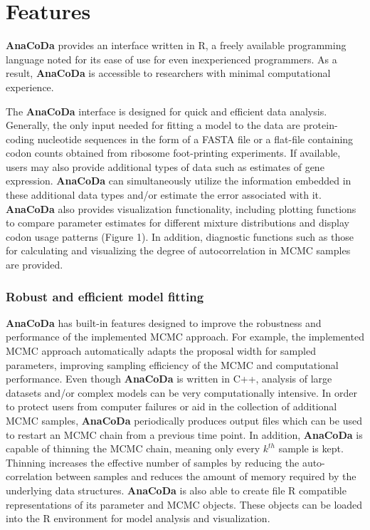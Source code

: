 \documentclass{bioinfo}
\newcommand{\package}{\textbf{AnaCoDa }} %
\begin{document}

\section*{Features}
\package provides an interface written in R, a freely available programming language noted for its ease of use for even inexperienced programmers. 
As a result, \package is accessible to researchers with minimal computational experience. 

The \package interface is designed for quick and efficient data analysis.
Generally, the only input needed for fitting a model to the data are protein-coding nucleotide sequences in the form of a FASTA file or a flat-file containing codon counts obtained from ribosome foot-printing experiments. 
If available, users may also provide additional types of data such as estimates of gene expression.
\package can simultaneously utilize the information embedded in these additional data types and/or estimate the error associated with it.
\package also provides visualization functionality, including plotting functions to compare parameter estimates for different mixture distributions and display codon usage patterns (Figure 1). In addition, diagnostic functions such as those for calculating and visualizing the degree of autocorrelation in MCMC samples are provided.

\subsubsection*{Robust and efficient model fitting}
\package has built-in features designed to improve the robustness and performance of the implemented MCMC approach. 
For example, the implemented MCMC approach automatically adapts the proposal width for sampled parameters, improving sampling efficiency of the MCMC and computational performance.
Even though \package is written in C++, analysis of large datasets and/or complex models can be very computationally intensive.
In order to protect users from computer failures or aid in the collection of additional MCMC samples, \package periodically produces output files which can be used to restart an MCMC chain from a previous time point.
In addition, \package is capable of thinning the MCMC chain, meaning only every $k^{th}$ sample is kept. 
Thinning increases the effective number of samples by reducing the auto-correlation between samples and reduces the amount of memory required by the underlying data structures. 
\package is also able to create file R compatible representations of its parameter and MCMC objects.
These objects can be loaded into the R environment for model analysis and visualization.
\end{document}
